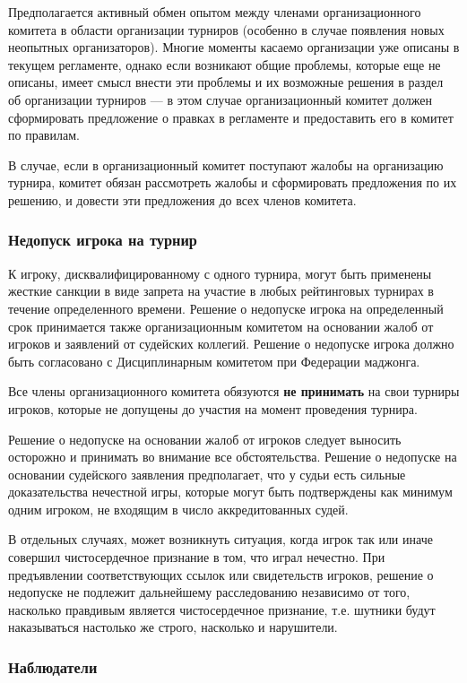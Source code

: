 Предполагается активный обмен опытом между членами организационного комитета в области организации турниров (особенно в случае появления новых неопытных организаторов). Многие моменты касаемо организации уже описаны в текущем регламенте, однако если возникают общие проблемы, которые еще не описаны, имеет смысл внести эти проблемы и их возможные решения в раздел об организации турниров --- в этом случае организационный комитет должен сформировать предложение о правках в регламенте и предоставить его в комитет по правилам.

В случае, если в организационный комитет поступают жалобы на организацию турнира, комитет обязан рассмотреть жалобы и сформировать предложения по их решению, и довести эти предложения до всех членов комитета.

\subsubsection{Недопуск игрока на турнир}

К игроку, дисквалифицированному с одного турнира, могут быть применены жесткие санкции в виде запрета на участие в любых рейтинговых турнирах в течение определенного времени. Решение о недопуске игрока на определенный срок принимается также организационным комитетом на основании жалоб от игроков и заявлений от судейских коллегий. Решение о недопуске игрока должно быть согласовано с Дисциплинарным комитетом при Федерации маджонга.

Все члены организационного комитета обязуются \textbf{не принимать} на свои турниры игроков, которые не допущены до участия на момент проведения турнира.

Решение о недопуске на основании жалоб от игроков следует выносить осторожно и принимать во внимание все обстоятельства. Решение о недопуске на основании судейского заявления предполагает, что у судьи есть сильные доказательства нечестной игры, которые могут быть подтверждены как минимум одним игроком, не входящим в число аккредитованных судей.

В отдельных случаях, может возникнуть ситуация, когда игрок так или иначе совершил чистосердечное признание в том, что играл нечестно. При предъявлении соответствующих ссылок или свидетельств игроков, решение о недопуске не подлежит дальнейшему расследованию независимо от того, насколько правдивым является чистосердечное признание, т.е. шутники будут наказываться настолько же строго, насколько и нарушители.

\subsubsection{Наблюдатели}

